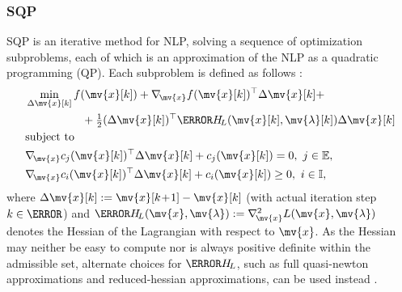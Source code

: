 \documentclass[journal]{IEEEtranTIE}
\begin{document}
\subsubsection{SQP}

SQP is an iterative method for NLP, solving a sequence of optimization subproblems, each of which is an approximation of the NLP as a quadratic programming (QP). Each subproblem is defined as follows \cite{jorge2006numerical}:
\begin{subequations}\label{eq:SQP}
\begin{align}
\small
&\mathop {\min }\limits_{\Delta\mv{x}[k]} f(\mv{x}[k]) + \nabla_{\!\mv{x}} f{(\mv{x}[k])^\top}\Delta\mv{x}[k]+  \nonumber \\ 
& \qquad \qquad \quad +\tfrac{1}{2}{(\Delta\mv{x}[k])^\top}\mm{H}_{\!L}(\mv{x}[k],\mv{\lambda}[k])\Delta\mv{x}[k]\\ 
&{\rm{subject\ to}} \nonumber \\
&\nabla_{\!\mv{x}} {c_j}{(\mv{x}[k])^\top}\Delta\mv{x}[k] + {c_j}(\mv{x}[k]) = 0,\ j \in \mathbb{E},\\
&\nabla_{\!\mv{x}} {c_i}{(\mv{x}[k])^\top}\Delta\mv{x}[k] + {c_i}(\mv{x}[k]) \ge 0,\ i \in \mathbb{I},
\end{align}
\end{subequations}
where $\Delta\mv{x}[k] := \mv{x}[k\!+\!1] - \mv{x}[k]$ (with actual iteration step $k\in \N$) and $\mm{H}_{\!L}(\mv{x},\mv{\lambda}) := \nabla_{\!\mv{x}}^2L(\mv{x},\mv{\lambda})$  denotes the Hessian  of the Lagrangian with respect to $\mv{x}$. As the Hessian may neither be easy to compute nor is always positive definite within the admissible set, alternate choices for $\mm{H}_{\!L}$, such as full quasi-newton approximations and reduced-hessian approximations, can be used instead \cite{jorge2006numerical}.
\end{document}
